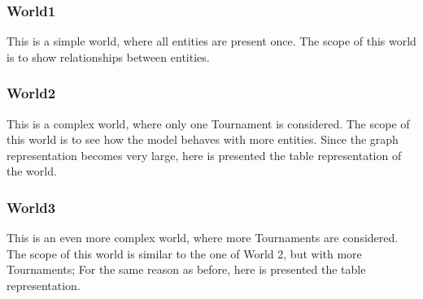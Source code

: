\subsubsection{World1} 
This is a simple world, where all entities are present once. The scope of this world is to show relationships between entities.
\clearpage
\subsubsection{World2}
This is a complex world, where only one Tournament is considered. The scope of this world is to see how the model behaves with more entities. 
Since the graph representation becomes very large, here is presented the table representation of the world.

\clearpage
\subsubsection{World3}
This is an even more complex world, where more Tournaments are considered. The scope of this world is similar to the one of World 2, but with more Tournaments;
For the same reason as before, here is presented the table representation.

